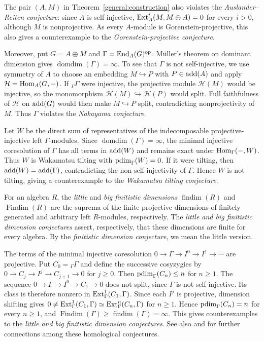 \documentclass[11pt]{article}
\begin{document}
\begin{Rem}
\label{audit:section}
The pair $(A,M)$ in Theorem~\ref{general:construction} also violates
the \emph{Auslander--Reiten conjecture}: since $A$ is self-injective,
${\rm Ext}_A^i(M,M\oplus A)=0$ for every $i>0$, although $M$ is
nonprojective. As every $A$-module is Gorenstein-projective, this
also gives a counterexample to the \emph{Gorenstein-projective conjecture}.

Moreover, put $G=A\oplus M$ and $\Gamma={\rm End}_A(G)^{\mathrm{op}}$.
M\"uller's theorem on dominant dimension \cite[Lemma~3]{Mueller} gives
$\operatorname{domdim}(\Gamma)=\infty$.
To see that $\Gamma$ is not self-injective, we use symmetry of $A$ to choose
an embedding $M\hookrightarrow P$ with $P\in{\rm add}(A)$ and apply
$\mathcal H={\rm Hom}_A(G,-)$. If ${}_\Gamma\Gamma$ were injective, the projective module
$\mathcal H(M)$ would be injective, so the monomorphism
$\mathcal H(M)\hookrightarrow\mathcal H(P)$ would split.
Full faithfulness of $\mathcal H$ on ${\rm add}(G)$ would then make $M\hookrightarrow P$ split,
contradicting nonprojectivity of $M$. Thus $\Gamma$ violates the \emph{Nakayama conjecture}.

Let $W$ be the direct sum of representatives of the indecomposable
projective-injective left $\Gamma$-modules. Since
$\operatorname{domdim}(\Gamma)=\infty$, the minimal injective coresolution
of $\Gamma$ has all terms in ${\rm add}(W)$ and remains exact under
${\rm Hom}_\Gamma(-,W)$. Thus $W$ is Wakamatsu tilting with ${\rm pdim}_\Gamma(W)=0$.
If it were tilting, then ${\rm add}(W)={\rm add}(\Gamma)$, contradicting the
non-self-injectivity of $\Gamma$.
Hence $W$ is not tilting, giving a counterexample to the
\emph{Wakamatsu tilting conjecture}.

For an algebra $R$, the \emph{little} and \emph{big finitistic dimensions}
$\operatorname{findim}(R)$ and $\operatorname{Findim}(R)$ are the suprema of the
finite projective dimensions of finitely generated and arbitrary left
$R$-modules, respectively. The \emph{little and big finitistic dimension
conjectures} assert, respectively, that these dimensions are finite for every
algebra. By the \emph{finitistic dimension conjecture}, we mean the little version.

The terms of the minimal injective coresolution $0\to\Gamma\to I^0\to I^1\to\cdots$ are projective.
Put $C_0={}_\Gamma\Gamma$ and define the successive cosyzygies by
$0\to C_j\to I^j\to C_{j+1}\to 0$ for $j\ge0$. Then ${\rm pdim}_\Gamma(C_n)\le n$ for $n\ge1$.
The sequence $0\to\Gamma\to I^0\to C_1\to0$ does not split,
since $\Gamma$ is not self-injective. Its class is therefore nonzero in
${\rm Ext}_\Gamma^1(C_1,\Gamma)$.
Since each $I^j$ is projective, dimension shifting gives
$0\ne{\rm Ext}_\Gamma^1(C_1,\Gamma)\simeq{\rm Ext}_\Gamma^n(C_n,\Gamma)$
for $n\ge1$. Hence ${\rm pdim}_\Gamma(C_n)=n$ for every $n\ge1$, and
$\operatorname{Findim}(\Gamma)\ge\operatorname{findim}(\Gamma)=\infty$.
This gives counterexamples to the \emph{little and big finitistic dimension
conjectures}. See also \cite{EM} and \cite[Section~8]{F} for further connections among these homological conjectures.
\end{Rem}
\end{document}
